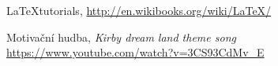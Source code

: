 \documentclass[twoside]{article}
\begin{document}
\begin{thebibliography}{9}


	\LaTeX tutorials, \url{http://en.wikibooks.org/wiki/LaTeX/}

	Motivační hudba, \emph{Kirby dream land theme song} \url{https://www.youtube.com/watch?v=3CS93CdMv_E}

\end{thebibliography}
\end{document}
